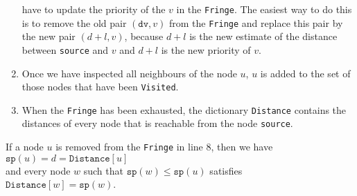\begin{enumerate}
      have to update the priority of the $v$ in the \texttt{Fringe}.  The easiest way to do this is to remove
      the old pair $(\texttt{dv}, v)$ from the \texttt{Fringe} and replace this pair by the new pair
      $(d+l, v)$, because $d+l$ is the new estimate of the distance between \texttt{source} and $v$ and
      $d+l$ is the new priority of $v$.
\item Once we have inspected all neighbours of the node $u$, $u$ is added to the set of those nodes that have
      been \texttt{Visited}.
\item When the \texttt{Fringe} has been exhausted, the dictionary \texttt{Distance} contains the distances of
      every node that is reachable from the node \texttt{source}.  
\end{enumerate}

\begin{Theorem}
  If a node $u$ is removed from the \texttt{Fringe} in line 8, then we have
  \\[0.2cm]
  \hspace*{1.3cm}
  $\texttt{sp}(u) = d = \texttt{Distance}[u]$
  \\[0.2cm]
  and every node $w$ such that $\texttt{sp}(w) \leq \texttt{sp}(u)$ satisfies
  \\[0.2cm]
  \hspace*{1.3cm}
  $\texttt{Distance}[w] = \texttt{sp}(w)$.
\end{Theorem}

